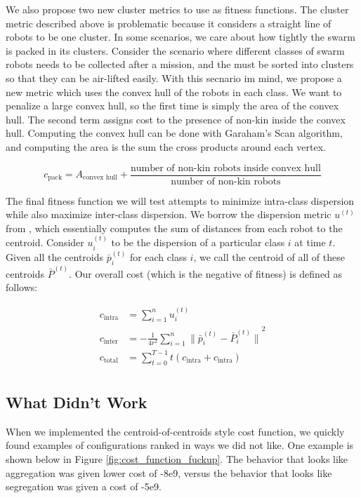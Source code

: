 \documentclass[conference]{IEEEtran}
\begin{document}
  We also propose two new cluster metrics to use as fitness functions. The cluster metric described above is problematic because it considers a straight line of robots to be one cluster. In some scenarios, we care about how tightly the swarm is packed in its clusters. Consider the scenario where different classes of swarm robots needs to be collected after a mission, and the must be sorted into clusters so that they can be air-lifted easily. With this secnario im mind, we propose a new metric which uses the convex hull of the robots in each class. We want to penalize a large convex hull, so the first time is simply the area of the convex hull. The second term assigns cost to the presence of non-kin inside the convex hull. Computing the convex hull can be done with Garaham's Scan algorithm, and computing the area is the sum the cross products around each vertex.

  $$ c_{\text{pack}} = A_\text{convex hull} + \frac{\text{number of non-kin robots inside convex hull}}{\text{number of non-kin robots}}$$

  The final fitness function we will test attempts to minimize intra-class dispersion while also maximize inter-class dispersion. We borrow the dispersion metric $u^{(t)}$ from \cite{gauci_self-organized_2014}, which essentially computes the sum of distances from each robot to the centroid. Consider $u_i^{(t)}$ to be the dispersion of a particular class $i$ at time $t$. Given all the centroids $\bar{p}_i^{(t)}$ for each class $i$, we call the centroid of all of these centroids $\bar{P}^{(t)}$. Our overall cost (which is the negative of fitness) is defined as follows:

  \begin{align*}
  c_{\text{intra}} &= \sum_{i=1}^n u_i^{(t)} \\
  c_{\text{inter}} &= -\frac{1} {4r^2}\sum_{i=1}^n{\lVert \bar{p}_i^{(t)} - \bar{P}_i^{(t)} \rVert}^2 \\
  c_{\text{total}} &=  \sum_{t=0}^{T-1} t (c_{\text{intra}} + c_{\text{intra}}) \\
  \end{align*}


  \subsection{What Didn't Work}

  When we implemented the centroid-of-centroids style cost function, we quickly found examples of configurations ranked in ways we did not like. One example is shown below in Figure \ref{fig:cost_function_fuckup}. The behavior that looks like aggregation was given lower cost of -8e9, versus the behavior that looks like segregation was given a cost of -5e9.
\end{document}

